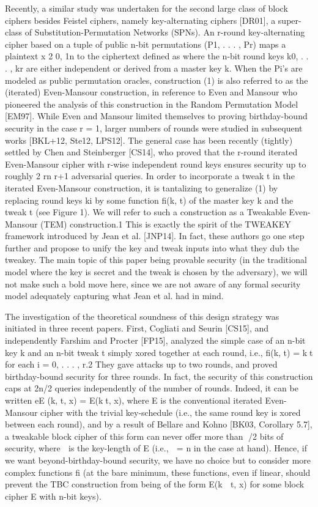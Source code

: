 Recently, a similar study
was undertaken for the second large class of block ciphers besides Feistel ciphers, namely
key-alternating ciphers [DR01], a super-class of Substitution-Permutation Networks (SPNs).
An r-round key-alternating cipher based on a tuple of public n-bit permutations (P1, . . . , Pr)
maps a plaintext x 2 {0, 1}n to the ciphertext defined as
%
%
%
%
%
where the n-bit round keys k0, . . . , kr are either independent or derived from a master key k.
When the Pi’s are modeled as public permutation oracles, construction (1) is also referred to
as the (iterated) Even-Mansour construction, in reference to Even and Mansour who pioneered
the analysis of this construction in the Random Permutation Model [EM97]. While Even
and Mansour limited themselves to proving birthday-bound security in the case r = 1, larger
numbers of rounds were studied in subsequent works [BKL+12, Ste12, LPS12]. The general
case has been recently (tightly) settled by Chen and Steinberger [CS14], who proved that the
r-round iterated Even-Mansour cipher with r-wise independent round keys ensures security
up to roughly 2 rn
r+1 adversarial queries.
In order to incorporate a tweak t in the iterated Even-Mansour construction, it is tantalizing
to generalize (1) by replacing round keys ki by some function fi(k, t) of the master key k and
the tweak t (see Figure 1). We will refer to such a construction as a Tweakable Even-Mansour
(TEM) construction.1 This is exactly the spirit of the TWEAKEY framework introduced by
Jean et al. [JNP14]. In fact, these authors go one step further and propose to unify the key
and tweak inputs into what they dub the tweakey. The main topic of this paper being provable
security (in the traditional model where the key is secret and the tweak is chosen by the
adversary), we will not make such a bold move here, since we are not aware of any formal
security model adequately capturing what Jean et al. had in mind.



The investigation of the theoretical soundness of this design strategy was initiated in three
recent papers. First, Cogliati and Seurin [CS15], and independently Farshim and Procter [FP15],
analyzed the simple case of an n-bit key k and an n-bit tweak t simply xored together at each
round, i.e., fi(k, t) = kt for each i = 0, . . . , r.2 They gave attacks up to two rounds, and proved
birthday-bound security for three rounds. In fact, the security of this construction caps at 2n/2
queries independently of the number of rounds. Indeed, it can be written eE (k, t, x) = E(kt, x),
where E is the conventional iterated Even-Mansour cipher with the trivial key-schedule (i.e.,
the same round key is xored between each round), and by a result of Bellare and Kohno [BK03,
Corollary 5.7], a tweakable block cipher of this form can never offer more than /2 bits of
security, where  is the key-length of E (i.e.,  = n in the case at hand). Hence, if we want
beyond-birthday-bound security, we have no choice but to consider more complex functions fi
(at the bare minimum, these functions, even if linear, should prevent the TBC construction
from being of the form E(k  t, x) for some block cipher E with n-bit keys).




